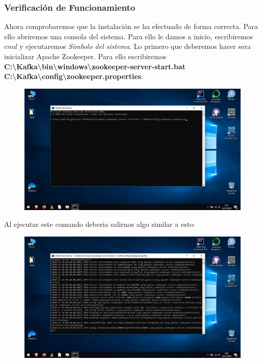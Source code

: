 \documentclass[a4paper,10pt]{article}
\begin{document}
\clearpage

\subsubsection{Verificación de Funcionamiento}

Ahora comprobaremos que la instalación se ha efectuado de forma correcta. Para ello abriremos una consola del sistema. Para ello le damos a inicio, escribiremos $\textit{cmd}$ y ejecutaremos \textit{Simbolo del sistema}. Lo primero que deberemos hacer sera inicializar Apache Zookeeper. Para ello escribiremos \textbf{C:\textbackslash Kafka\textbackslash bin\textbackslash windows\textbackslash zookeeper-server-start.bat C:\textbackslash Kafka\textbackslash config\textbackslash zookeeper.properties}:

\begin{figure}[H]
\begin{center}
\includegraphics[width=450pt]{./fotos/Kafka/06.jpg}
\end{center}
\end{figure}

Al ejecutar este comando deberia salirnos algo similar a esto:

\begin{figure}[H]
\begin{center}
\includegraphics[width=450pt]{./fotos/Kafka/07.jpg}
\end{center}
\end{figure}
\end{document}
